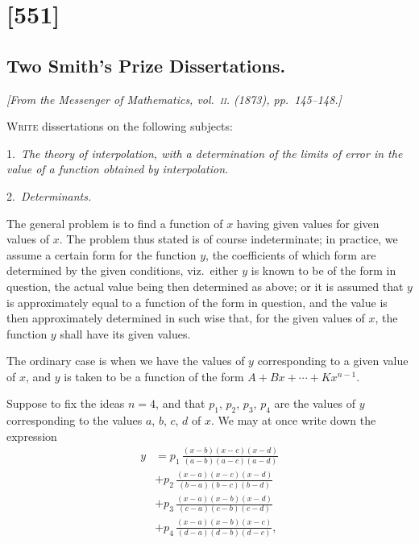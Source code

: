 \documentclass[11pt,a4paper]{book}
\begin{document}
\clearpage

\section{[551]}
\subsection{Two Smith's Prize Dissertations.}

\begin{center}
\textit{[From the Messenger of Mathematics, vol.~\textsc{ii}. (1873), pp.~145--148.]}
\end{center}

\textsc{Write} dissertations on the following subjects:

1.\ \textit{The theory of interpolation, with a determination of the limits of error in the
value of a function obtained by interpolation.}

2.\ \textit{Determinants.}

The general problem is to find a function of $x$ having given values for
given values of $x$. The problem thus stated is of course indeterminate; in practice, we
assume a certain form for the function $y$, the coefficients of which form are determined
by the given conditions, viz.\ either $y$ is known to be of the form in question, the
actual value being then determined as above; or it is assumed that $y$ is approximately
equal to a function of the form in question, and the value is then approximately
determined in such wise that, for the given values of $x$, the function $y$ shall have its
given values.

The ordinary case is when we have the values of $y$ corresponding to a given
value of $x$, and $y$ is taken to be a function of the form $A + Bx + \cdots + Kx^{n-1}$.

Suppose to fix the ideas $n = 4$, and that $p_1$, $p_2$, $p_3$, $p_4$ are the values of $y$ corresponding to the values $a$, $b$, $c$, $d$ of $x$. We may at once write down the expression
\begin{align*}
y &= p_1\,\frac{(x-b)(x-c)(x-d)}{(a-b)(a-c)(a-d)} \\
&+ p_2\,\frac{(x-a)(x-c)(x-d)}{(b-a)(b-c)(b-d)} \\
&+ p_3\,\frac{(x-a)(x-b)(x-d)}{(c-a)(c-b)(c-d)} \\
&+ p_4\,\frac{(x-a)(x-b)(x-c)}{(d-a)(d-b)(d-c)},
\end{align*}
\end{document}
